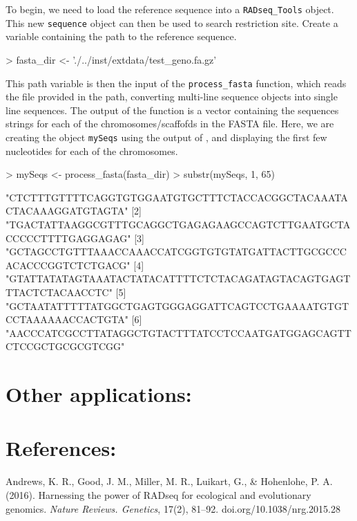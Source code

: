 \documentclass{article}
\begin{document}
To begin, we need to load the reference sequence into a \texttt{RADseq\_Tools} object. This new \texttt{sequence} object can then be used to search restriction site. Create a variable containing the path to the reference sequence.  
\begin{Schunk}
\begin{Sinput}
> fasta_dir <- './../inst/extdata/test_geno.fa.gz'
\end{Sinput}
\end{Schunk}
This path variable is then the input of the \texttt{process\_fasta} function, which reads the file provided in the path, converting multi-line sequence objects into single line sequences. The output of the function is a vector containing the sequences strings for each of the chromosomes/scaffofds in the FASTA file. Here, we are creating the object \texttt{mySeqs} using the output of , and displaying the first few nucleotides for each of the chromosomes. 
\begin{Schunk}
\begin{Sinput}
> mySeqs <- process_fasta(fasta_dir)
> substr(mySeqs, 1, 65)
\end{Sinput}
\begin{Soutput}
[1] "CTCTTTGTTTTCAGGTGTGGAATGTGCTTTCTACCACGGCTACAAATACTACAAAGGATGTAGTA"
[2] "TGACTATTAAGGCGTTTGCAGGCTGAGAGAAGCCAGTCTTGAATGCTACCCCCTTTTGAGGAGAG"
[3] "GCTAGCCTGTTTAAACCAAACCATCGGTGTGTATGATTACTTGCGCCCACACCCGGTCTCTGACG"
[4] "GTATTATATAGTAAATACTATACATTTTCTCTACAGATAGTACAGTGAGTTTACTCTACAACCTC"
[5] "GCTAATATTTTTATGGCTGAGTGGGAGGATTCAGTCCTGAAAATGTGTCCTAAAAAACCACTGTA"
[6] "AACCCATCGCCTTATAGGCTGTACTTTATCCTCCAATGATGGAGCAGTTCTCCGCTGCGCGTCGG"
\end{Soutput}
\end{Schunk}


\subsection*{}
\section*{Other applications:}
\section*{References:}


Andrews, K. R., Good, J. M., Miller, M. R., Luikart, G., \& Hohenlohe, P. A. (2016). Harnessing the power of RADseq for ecological and evolutionary genomics. \emph{Nature Reviews. Genetics}, 17(2), 81–92. doi.org/10.1038/nrg.2015.28
\end{document}
